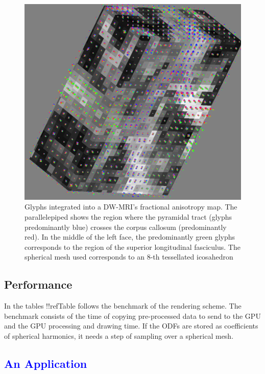 \documentclass[twoside,twocolumn,10pt]{article}
\begin{document}
\begin{figure}[htb]
    \centering
    \includegraphics[width=1.00\linewidth, angle=0]{figs/Results/Glyphs_onFAMAP_2.png}
    \caption{Glyphs integrated into a DW-MRI's fractional anisotropy map. The parallelepiped shows the region where the pyramidal tract (glyphs predominantly blue) crosses the corpus callosum (predominantly red). In the middle of the left face, the predominantly green glyphs corresponds to the region of the superior longitudinal fasciculus. The spherical mesh used corresponds to an 8-th tessellated icosahedron}
    \label{fig::ex_glyph_FAMAP}
\end{figure}

\subsection{Performance}

In the tables !!refTable follows the benchmark of the rendering scheme. The benchmark consists of the time of copying pre-processed data to send to the GPU and the GPU processing and drawing time. If the ODFs are stored as coefficients of spherical harmonics, it needs a step of sampling over a spherical mesh.

\subsection{\textcolor{blue}{An Application}}
\end{document}
